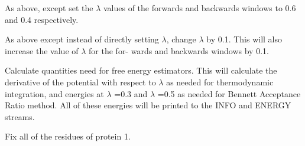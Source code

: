 \documentclass[letterpaper,10pt,english]{sphinxmanual}
\begin{document}
%
\begin{sphinxVerbatim}[commandchars=\\\{\}]
    
\end{sphinxVerbatim}

As above, except set the \(\lambda\) values of the forwards and backwards windows to 0.6 and 0.4 respectively.

%
\begin{sphinxVerbatim}[commandchars=\\\{\}]
   
\end{sphinxVerbatim}

As above except instead of directly setting \(\lambda\), change \(\lambda\) by 0.1. This will also increase the value of \(\lambda\) for the for- wards and backwards windows by 0.1.

\ignorespaces 
\def\sphinxLiteralBlockLabel{\label{\detokenize{protoms:index-87}}}
%
\begin{sphinxVerbatim}[commandchars=\\\{\}]
   
\end{sphinxVerbatim}

Calculate quantities need for free energy estimators. This will calculate the derivative of the potential with respect to \(\lambda\) as needed for thermodynamic integration, and energies at \(\lambda\) =0.3 and \(\lambda\) =0.5 as needed for Bennett Acceptance Ratio method. All of these energies will be printed to the INFO and ENERGY streams.

\ignorespaces 
\def\sphinxLiteralBlockLabel{\label{\detokenize{protoms:index-88}}}
%
\begin{sphinxVerbatim}[commandchars=\\\{\}]
   
\end{sphinxVerbatim}

Fix all of the residues of protein 1.

%
\begin{sphinxVerbatim}[commandchars=\\\{\}]
      
\end{sphinxVerbatim}
\end{document}
